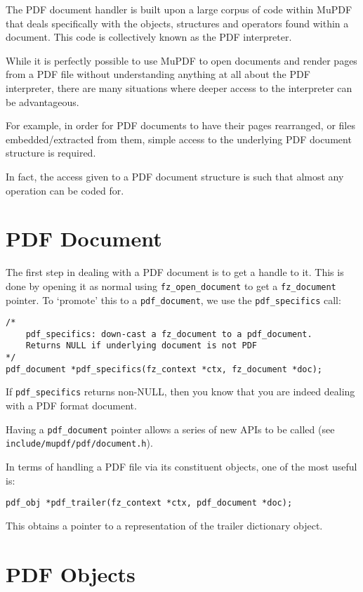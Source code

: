 \documentclass[oneside]{book}
\begin{document}
The PDF document handler is built upon a large corpus of code within MuPDF that deals specifically with the objects, structures and operators found within a document. This code is collectively known as the PDF interpreter.

While it is perfectly possible to use MuPDF to open documents and render pages from a PDF file without understanding anything at all about the PDF interpreter, there are many situations where deeper access to the interpreter can be advantageous.

For example, in order for PDF documents to have their pages rearranged, or files embedded/extracted from them, simple access to the underlying PDF document structure is required.

In fact, the access given to a PDF document structure is such that almost any operation can be coded for.

\section{PDF Document}

The first step in dealing with a PDF document is to get a handle to it. This is done by opening it as normal using \texttt{fz\_open\_document} to get a \texttt{fz\_document} pointer. To `promote' this to a \texttt{pdf\_document}, we use the \texttt{pdf\_specifics} call:

\begin{lstlisting}
/*
	pdf_specifics: down-cast a fz_document to a pdf_document.
	Returns NULL if underlying document is not PDF
*/
pdf_document *pdf_specifics(fz_context *ctx, fz_document *doc);
\end{lstlisting}

If \texttt{pdf\_specifics} returns non-NULL, then you know that you are indeed dealing with a PDF format document.

Having a \texttt{pdf\_document} pointer allows a series of new APIs to be called (see \texttt{include\slash mupdf\slash pdf\slash document.h}).

In terms of handling a PDF file via its constituent objects, one of the most useful is:

\begin{lstlisting}
pdf_obj *pdf_trailer(fz_context *ctx, pdf_document *doc);
\end{lstlisting}

This obtains a pointer to a representation of the trailer dictionary object.

\section{PDF Objects}
\end{document}
